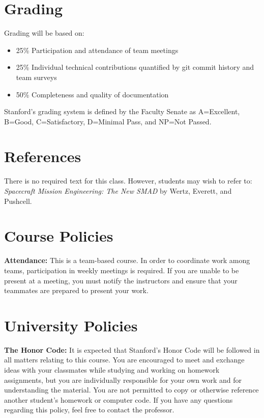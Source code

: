 \documentclass[11pt,letterpaper]{article}
\begin{document}
\section*{Grading}

Grading will be based on:
\begin{itemize}
	\item 25\% Participation and attendance of team meetings
	\item 25\% Individual technical contributions quantified by git commit history and team surveys
	\item 50\% Completeness and quality of documentation
\end{itemize}
Stanford's grading system is defined by the Faculty Senate as A=Excellent, B=Good, C=Satisfactory, D=Minimal Pass, and NP=Not Passed.

\section*{References}

There is no required text for this class. However, students may wish to refer to: \textit{Spacecraft Mission Engineering: The New SMAD} by Wertz, Everett, and Pushcell.

\section*{Course Policies}

\textbf{Attendance:} This is a team-based course. In order to coordinate work among teams, participation in weekly meetings is required. If you are unable to be present at a meeting, you must notify the instructors and ensure that your teammates are prepared to present your work.

\section*{University Policies}

\textbf{The Honor Code:} It is expected that Stanford's Honor Code will be followed in all matters relating to this course. You are encouraged to meet and exchange ideas with your classmates while studying and working on homework assignments, but you are individually responsible for your own work and for understanding the material. You are not permitted to copy or otherwise reference another student's homework or computer code. If you have any questions regarding this policy, feel free to contact the professor.
\end{document}
